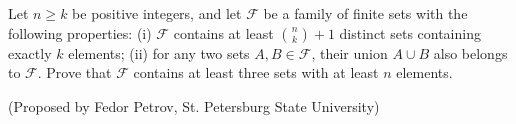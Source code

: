 Let $n\ge k$ be positive integers, and let $\mathcal{F}$ be a family of finite sets with the following properties:
(i) $\mathcal{F}$ contains at least $\binom{n}{k}+1$ distinct sets containing exactly $k$ elements;
(ii) for any two sets $A, B\in \mathcal{F}$, their union $A\cup B$ also belongs to $\mathcal{F}$.
Prove that $\mathcal{F}$ contains at least three sets with at least $n$ elements.

(Proposed by Fedor Petrov, St. Petersburg State University)